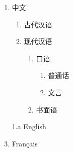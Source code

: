 \documentclass[nofonts]{ctexart}
\begin{document}
\begin{enumerate}
	\item 中文
	\begin{enumerate}
		\item 古代汉语
		\item 现代汉语
		\begin{enumerate}
			\item 口语
			\begin{enumerate}
				\item 普通话
				\item 文言
			\end{enumerate}
			\item 书面语
		\end{enumerate}
	\end{enumerate}
	\item[1.a] English
	\item Fran\c{c}ais
\end{enumerate}
\end{document}
